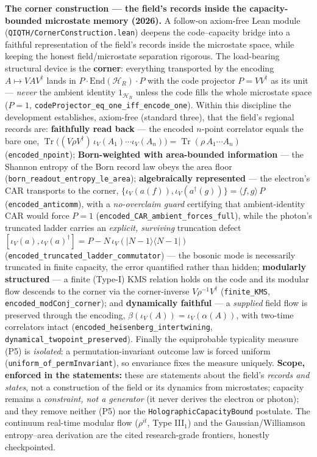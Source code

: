 \documentclass[11pt,a4paper]{article}
\begin{document}
\textbf{The corner construction — the field's records inside the capacity-bounded microstate memory (2026).} A follow-on axiom-free Lean module (\texttt{QIQTH/CornerConstruction.lean}) deepens the code–capacity bridge into a faithful representation of the field's records inside the microstate space, while keeping the honest field/microstate separation rigorous. The load-bearing structural device is the \textbf{corner}: everything transported by the encoding $A \mapsto VAV^\dagger$ lands in $P\cdot\mathrm{End}(\mathcal{H}_R)\cdot P$ with the code projector $P=VV^\dagger$ as its unit — \emph{never} the ambient identity $1_{\mathcal{H}_R}$ unless the code fills the whole microstate space ($P=1$, \texttt{codeProjector\_eq\_one\_iff\_encode\_one}). Within this discipline the development establishes, axiom-free (standard three), that the field's regional records are: \textbf{faithfully read back} — the encoded $n$-point correlator equals the bare one, $\operatorname{Tr}\!\big((V\rho V^\dagger)\,\iota_V(A_1)\cdots\iota_V(A_n)\big) = \operatorname{Tr}(\rho\,A_1\cdots A_n)$ (\texttt{encoded\_npoint}); \textbf{Born-weighted with area-bounded information} — the Shannon entropy of the Born record law obeys the area floor (\texttt{born\_readout\_entropy\_le\_area}); \textbf{algebraically represented} — the electron's CAR transports to the corner, $\{\iota_V(a(f)),\iota_V(a^\dagger(g))\} = \langle f,g\rangle\,P$ (\texttt{encoded\_anticomm}), with a \emph{no-overclaim guard} certifying that ambient-identity CAR would force $P=1$ (\texttt{encoded\_CAR\_ambient\_forces\_full}), while the photon's truncated ladder carries an \emph{explicit, surviving} truncation defect $[\iota_V(a),\iota_V(a)^\dagger]=P-N\,\iota_V(|N{-}1\rangle\langle N{-}1|)$ (\texttt{encoded\_truncated\_ladder\_commutator}) — the bosonic mode is necessarily truncated in finite capacity, the error quantified rather than hidden; \textbf{modularly structured} — a finite (Type-I) KMS relation holds on the code and its modular flow descends to the corner via the corner-inverse $V\rho^{-1}V^\dagger$ (\texttt{finite\_KMS}, \texttt{encoded\_modConj\_corner}); and \textbf{dynamically faithful} — a \emph{supplied} field flow is preserved through the encoding, $\beta(\iota_V(A))=\iota_V(\alpha(A))$, with two-time correlators intact (\texttt{encoded\_heisenberg\_intertwining}, \texttt{dynamical\_twopoint\_preserved}). Finally the equiprobable typicality measure (P5) is \emph{isolated}: a permutation-invariant outcome law is forced uniform (\texttt{uniform\_of\_permInvariant}), so envariance fixes the measure uniquely. \textbf{Scope, enforced in the statements:} these are statements about the field's \emph{records and states}, not a construction of the field or its dynamics from microstates; capacity remains a \emph{constraint, not a generator} (it never derives the electron or photon); and they remove neither (P5) nor the \texttt{HolographicCapacityBound} postulate. The continuum real-time modular flow ($\rho^{it}$, Type III$_1$) and the Gaussian/Williamson entropy–area derivation are the cited research-grade frontiers, honestly checkpointed.
\end{document}
